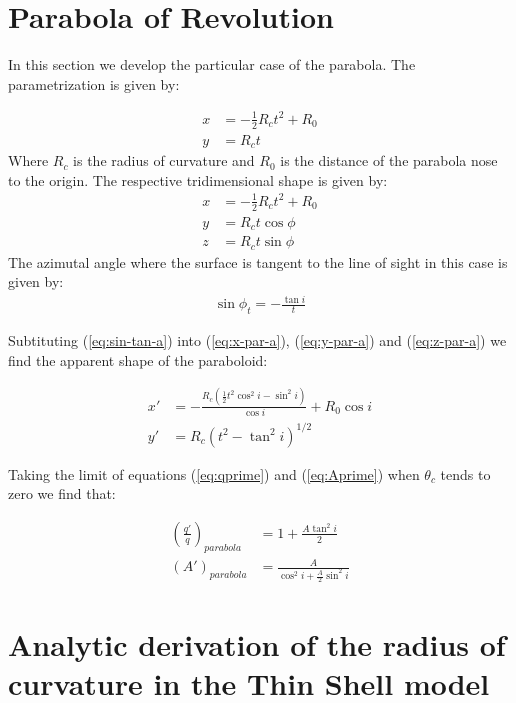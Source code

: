\appendix
\appendixpage
\addappheadtotoc
\section{Parabola of Revolution}
\label{app:parabola}

In this section we develop the particular case of the parabola.
The parametrization is given by:

\begin{align}
x &= - \frac{1}{2}R_ct^2 + R_0 \\
y &= R_c t
\end{align}
Where $R_c$ is the radius of curvature and $R_0$ is the distance of the parabola nose to the
origin.
The respective tridimensional shape is given by:
\begin{align}
x &= -\frac{1}{2}R_ct^2 + R_0 \label{eq:x-par-a}\\
y &= R_c t \cos\phi  \label{eq:y-par-a}\\
z &= R_c t \sin\phi  \label{eq:z-par-a}
\end{align}
The azimutal angle where the surface is tangent to the line of sight in this case is given by:
\begin{align}
\sin\phi_t = -\frac{\tan i}{t} \label{eq:sin-tan-a} 
\end{align}

Subtituting (\ref{eq:sin-tan-a}) into (\ref{eq:x-par-a}), (\ref{eq:y-par-a}) and
(\ref{eq:z-par-a}) we find the apparent shape
of the paraboloid:

\begin{align}
x' &= -\frac{R_c(\frac{1}{2}t^2 \cos^2 i -\sin^2 i)}{\cos i}+R_0\cos i \\
y' &= R_c\left(t^2-\tan^2 i\right)^{1/2} 
\end{align}

Taking the limit of equations (\ref{eq:qprime}) and (\ref{eq:Aprime}) when $\theta_c$ tends to zero we find that:

\begin{align}
\left(\frac{q'}{q}\right)_{parabola} &= 1+\frac{A\tan^2 i}{2}\\
\left(A'\right)_{parabola} &= \frac{A}{\cos^2 i + \frac{A}{2}\sin^2 i}
\end{align}

\section{Analytic derivation of the radius of curvature in the Thin Shell model}
\label{app:rc-analytic}

